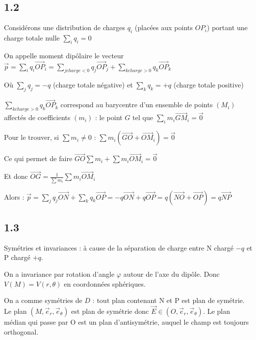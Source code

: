 \documentclass[a4paper,12pt]{book}
\begin{document}
\subsection{1.2}
Considérons une distribution de charges $q_i$ (placées aux points $OP_i$) portant une charge totale nulle $\sum\limits_i q_i=0$\par On appelle moment dipôlaire le vecteur $\vec{p}=\sum\limits_i q_i\vec{OP}_i = \sum\limits_{j charge<0}q_j\vec{OP}_j + \sum\limits_{kcharge>0}q_k\vec{OP}_k$
\par Où $\sum\limits_j q_j = -q$ (charge totale négative) et $\sum\limits_k q_k=+q$ (charge totale positive)
\par $\sum\limits_{kcharge>0}q_k\vec{OP}_k$ correspond au barycentre d'un ensemble de points $(M_i)$ affectés de coefficients $(m_i)$ : le point $G$ tel que $\sum\limits_i m_i \vec{GM}_i = \vec{0}$ \par Pour le trouver, si $\sum m_i\neq 0$ : $\sum m_i(\vec{GO}+\vec{OM}_i)=\vec{0}$ \par Ce qui permet de faire $\vec{GO}\sum m_i + \sum m_i\vec{OM}_i =\vec{0}$ \par Et donc $\vec{OG}=\frac{1}{\sum m_i}\sum m_i\vec{OM}_i$
\par Alors : $\vec{p} = \sum_j q_j\vec{ON} + \sum_k q_k\vec{OP} = -q\vec{ON} + q\vec{OP}=q(\vec{NO}+\vec{OP})=q\vec{NP}$

\subsection{1.3}
Symétries et invariances : à cause de la séparation de charge entre N chargé $-q$ et P chargé $+q$.
\par On a invariance par rotation d'angle $\varphi$ autour de l'axe du dipôle. Donc $V(M)=V(r,\theta)$ en coordonnées sphériques.
\par On a comme symétries de $D$ : tout plan contenant N et P est plan de symétrie. Le plan $(M,\vec{e}_r, \vec{e}_\theta)$ est plan de symétrie donc $\vec{E}\in (O, \vec{e}_r,\vec{e}_\theta)$. Le plan médian qui passe par O est un plan d'antisymétrie, auquel le champ est toujours orthogonal.
\end{document}
